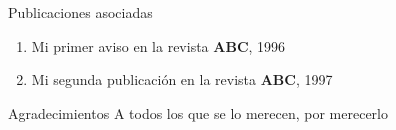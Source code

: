 \documentclass[screen,pagebackref]{ibtesis}
\begin{document}
\begin{postliminary}

    \begin{seccion}{Publicaciones asociadas}
        \begin{enumerate}
            \item Mi primer aviso en la revista \textbf{ABC}, 1996
            \item Mi segunda publicaci\'{o}n en la revista \textbf{ABC}, 1997
        \end{enumerate}
    \end{seccion}

    \begin{seccion}{Agradecimientos}
        A todos los que se lo merecen, por merecerlo
    \end{seccion}

\end{postliminary}
\end{document}
